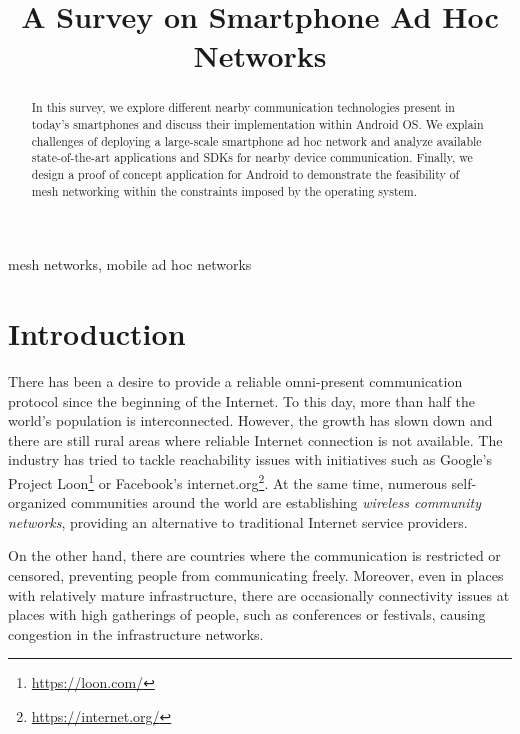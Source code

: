 \documentclass[conference,compsoc]{IEEEtran}
\begin{document}
\title{A Survey on Smartphone Ad Hoc Networks}

\author{
}

\maketitle

\begin{abstract}

In this survey, we explore different nearby communication technologies  present in today's smartphones and discuss their implementation within Android OS. We explain challenges of deploying a large-scale smartphone ad hoc network and analyze available state-of-the-art applications and SDKs for nearby device communication. Finally, we design a proof of concept application for Android to demonstrate the feasibility of mesh networking within the constraints imposed by the operating system.

\end{abstract}

\begin{IEEEkeywords}mesh networks, mobile ad hoc networks\end{IEEEkeywords}

\section{Introduction}

There has been a desire to provide a reliable omni-present communication protocol since the beginning of the Internet. To this day, more than half the world's population is interconnected. However, the growth has slown down and there are still rural areas where reliable Internet connection is not available. The industry has tried to tackle reachability issues with initiatives such as Google's Project Loon\footnote{\url{https://loon.com/}} or Facebook's internet.org\footnote{\url{https://internet.org/}}. At the same time, numerous self-organized communities around the world are establishing \textit{wireless community networks}, providing an alternative to traditional Internet service providers. \cite{wcn}


On the other hand, there are countries where the communication is restricted or censored, preventing people from communicating freely. Moreover, even in places with relatively mature infrastructure, there are occasionally connectivity issues at places with high gatherings of people, such as conferences or festivals, causing congestion in the infrastructure networks.
\end{document}
